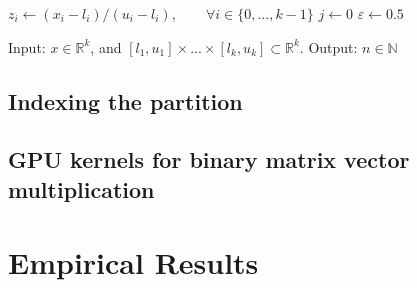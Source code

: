 \documentclass{llncs}
\begin{document}
\begin{algorithm} 
	\begin{algorithmic}[1]
		\State $z_i \gets (x_i-l_i)/(u_i-l_i),\qquad \forall i\in\{0,...,k-1\}$ 
		\State $j\gets 0$ 
		\State $\varepsilon \gets 0.5$
		\EndFor
	\end{algorithmic} \caption{\label{alg:zcurve} Input: $x\in \mathbb{R}^k$, and $[l_1,u_1]\times ... \times [l_k,u_k]\subset \mathbb{R}^k$. Output: $n\in \mathbb{N}$ } 
\end{algorithm}

\subsection{Indexing the partition}
\subsection{GPU kernels for binary matrix vector multiplication}

\section{\label{sec:experiments}Empirical Results}




\end{document}
